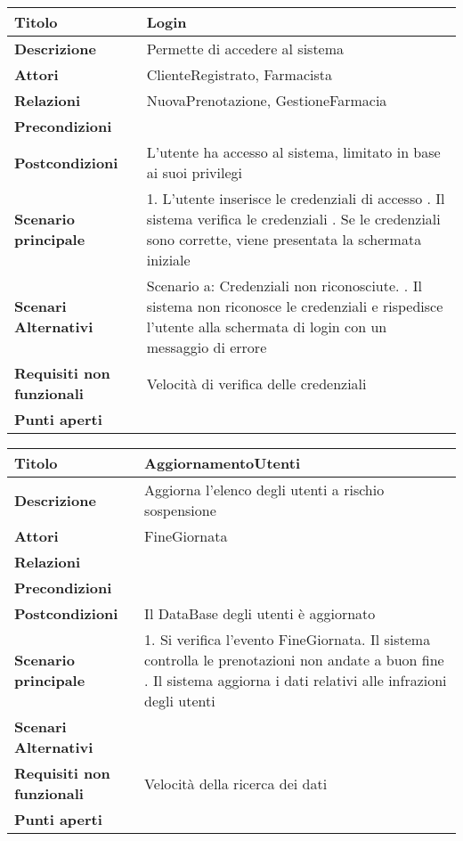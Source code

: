 \hfill
\break

\begin{tabular} {|P{4.5cm}|P{12.5cm}|}
\hline
  \textbf{Titolo} & Login\\
\hline
  \textbf{Descrizione} & Permette di accedere al sistema\\
\hline
  \textbf{Attori} & ClienteRegistrato, Farmacista\\
\hline
  \textbf{Relazioni} & NuovaPrenotazione, GestioneFarmacia\\
\hline
  \textbf{Precondizioni} &\\
\hline
  \textbf{Postcondizioni} & L'utente ha accesso al sistema, limitato in base ai suoi privilegi\\
\hline
  \textbf{Scenario principale} & 1. L'utente inserisce le credenziali di accesso . Il sistema verifica le credenziali . Se le credenziali sono corrette, viene presentata la schermata iniziale\\
\hline
  \textbf{Scenari Alternativi} & Scenario a: Credenziali non riconosciute. . Il sistema non riconosce le credenziali e rispedisce l'utente alla schermata di login con un messaggio di errore\\
\hline
  \textbf{Requisiti non funzionali} & Velocità di verifica delle credenziali\\
\hline
  \textbf{Punti aperti} &\\
\hline
\end{tabular}

\hfill
\break


\begin{tabular} {|P{4.5cm}|P{12.5cm}|}
\hline
  \textbf{Titolo} & AggiornamentoUtenti\\
\hline
  \textbf{Descrizione} & Aggiorna l'elenco degli utenti a rischio sospensione\\
\hline
  \textbf{Attori} & FineGiornata\\
\hline
  \textbf{Relazioni} &\\
\hline
  \textbf{Precondizioni} &\\
\hline
  \textbf{Postcondizioni} & Il DataBase degli utenti è aggiornato\\
\hline
  \textbf{Scenario principale} & 1. Si verifica l'evento FineGiornata. Il sistema controlla le prenotazioni non andate a buon fine . Il sistema aggiorna i dati relativi alle infrazioni degli utenti\\
\hline
  \textbf{Scenari Alternativi} &\\
\hline
  \textbf{Requisiti non funzionali} & Velocità della ricerca dei dati\\
\hline
  \textbf{Punti aperti} &\\
\hline
\end{tabular}
\\


